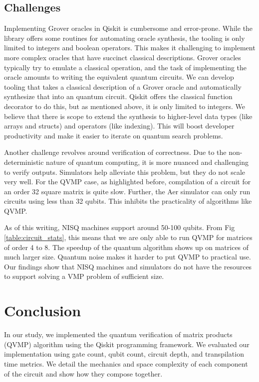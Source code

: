 \documentclass[11pt]{article}
\theoremstyle{definition}
\theoremstyle{remark}
\begin{document}
\subsection{Challenges}

Implementing Grover oracles in Qiskit is cumbersome and error-prone. While the
library offers some routines for automating oracle synthesis, the tooling is
only limited to integers and boolean operators. This makes it challenging to
implement more complex oracles that have succinct classical descriptions.
Grover oracles typically try to emulate a classical operation, and the task of
implementing the oracle amounts to writing the equivalent quantum circuits. We
can develop tooling that takes a classical description of a Grover oracle and
automatically synthesize that into an quantum circuit. Qiskit offers the
classical function decorator to do this, but as mentioned above, it is
only limited to integers. We believe that there is scope to extend the
synthesis to higher-level data types (like arrays and structs) and operators
(like indexing). This will boost developer productivity and make it easier to
iterate on quantum search problems.

Another challenge revolves around verification of correctness. Due to the
non-deterministic nature of quantum computing, it is more nuanced and
challenging to verify outputs. Simulators help alleviate this problem, but they
do not scale very well. For the QVMP case, as highlighted before, compilation
of a circuit for an order 32 square matrix is quite slow. Further, the Aer
simulator can only run circuits using less than 32 qubits. This inhibits the
practicality of algorithms like QVMP. 

As of this writing, NISQ machines support around 50-100 qubits. From Fig
\ref{table:circuit_stats}, this means that we are only able to run QVMP for
matrices of order 4 to 8.  The speedup of the quantum algorithm shows up on
matrices of much larger size.  Quantum noise makes it harder to put QVMP to
practical use. Our findings show that NISQ machines and simulators do not have
the resources to support solving a VMP problem of sufficient size.

\section{Conclusion}

In our study, we implemented the quantum verification of matrix products (QVMP)
algorithm using the Qiskit programming framework. We evaluated our
implementation using gate count, qubit count, circuit depth, and transpilation
time metrics. We detail the mechanics and space complexity of each component of
the circuit and show how they compose together. 
\end{document}
